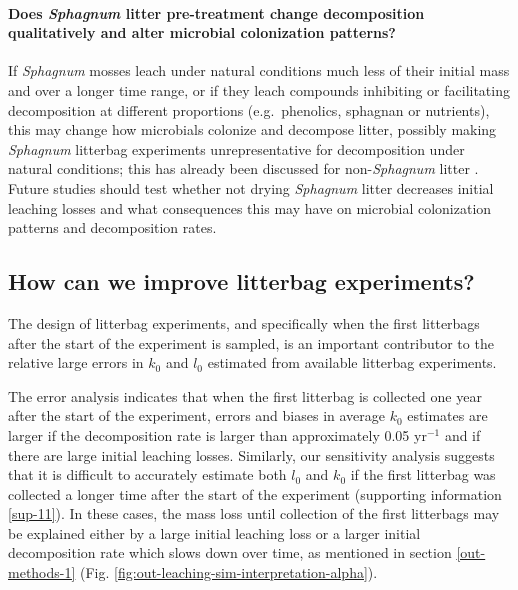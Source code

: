 \documentclass[bg, manuscript]{copernicus}
\begin{document}
\paragraph*{\texorpdfstring{Does \emph{Sphagnum} litter pre-treatment change decomposition qualitatively and alter microbial colonization patterns?}{Does Sphagnum litter pre-treatment change decomposition qualitatively and alter microbial colonization patterns?}}

If \emph{Sphagnum} mosses leach under natural conditions much less of their initial mass and over a longer time range, or if they leach compounds inhibiting or facilitating decomposition at different proportions (e.g.~phenolics, sphagnan \citep{Fenner.2011, Hajek.2011, Hajek.2024} or nutrients), this may change how microbials colonize and decompose litter, possibly making \emph{Sphagnum} litterbag experiments unrepresentative for decomposition under natural conditions; this has already been discussed for non-\emph{Sphagnum} litter \citep{Barlocher.1997}. Future studies should test whether not drying \emph{Sphagnum} litter decreases initial leaching losses and what consequences this may have on microbial colonization patterns and decomposition rates.

\hypertarget{out-discussion-5}{%
\subsection{How can we improve litterbag experiments?}\label{out-discussion-5}}

The design of litterbag experiments, and specifically when the first litterbags after the start of the experiment is sampled, is an important contributor to the relative large errors in \(k_0\) and \(l_0\) estimated from available litterbag experiments.

The error analysis indicates that when the first litterbag is collected one year after the start of the experiment, errors and biases in average \(k_0\) estimates are larger if the decomposition rate is larger than approximately 0.05 yr\(^{-1}\) and if there are large initial leaching losses. Similarly, our sensitivity analysis suggests that it is difficult to accurately estimate both \(l_0\) and \(k_0\) if the first litterbag was collected a longer time after the start of the experiment (supporting information \ref{sup-11}). In these cases, the mass loss until collection of the first litterbags may be explained either by a large initial leaching loss or a larger initial decomposition rate which slows down over time, as mentioned in section \ref{out-methods-1} (Fig. \ref{fig:out-leaching-sim-interpretation-alpha}).
\end{document}
